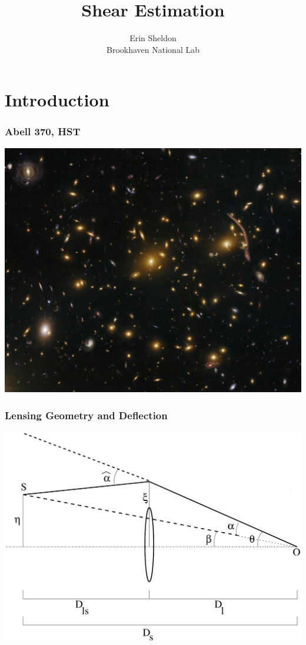 \documentclass{beamer}
\title{Shear Estimation}
\author
{
    Erin Sheldon \\
    Brookhaven National Lab
}
\begin{document}
\frame{\titlepage}

\section{Introduction}

\frame
{
    \frametitle{Abell 370, HST}
    \includegraphics[width=\textwidth]{abell370_hst_med.jpg}
}
\frame
{
    \frametitle{Lensing Geometry and Deflection}
    \includegraphics[width=\textwidth]{lens_geometry.pdf}
}
\end{document}

